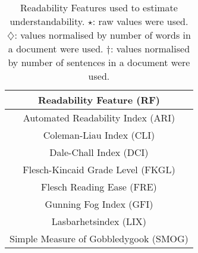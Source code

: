 \begin{table}
\caption{Readability Features used to estimate understandability. $\star$: raw values were
used. $\diamondsuit$: values normalised by number of words in a document
were used. $\dagger$: values normalised by number of sentences in
a document were used.}
\label{tab:doc_features_rf} \vspace{-10pt}
\begin{tabular}{|c|}
\toprule 
\textbf{Readability Feature (RF)}\tabularnewline
\midrule
Automated Readability Index (ARI) \cite{ari67} \tabularnewline
Coleman-Liau Index (CLI) \cite{cli75} \tabularnewline
Dale-Chall Index (DCI) \cite{dale48} \tabularnewline
Flesch-Kincaid Grade Level (FKGL) \cite{flesch75} \tabularnewline
Flesch Reading Ease (FRE) \cite{flesch75} \tabularnewline
Gunning Fog Index (GFI) \cite{gunning52} \tabularnewline
Lasbarhetsindex (LIX) \cite{lix} \tabularnewline
Simple Measure of Gobbledygook (SMOG) \cite{smog69} \tabularnewline
\bottomrule 
\end{tabular}
\end{table}

